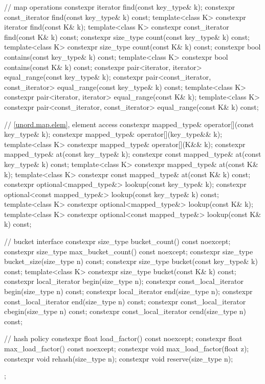 \begin{codeblock}
{{    // map operations
    constexpr iterator         find(const key_type& k);
    constexpr const_iterator   find(const key_type& k) const;
    template<class K>
      constexpr iterator       find(const K& k);
    template<class K>
      constexpr const_iterator find(const K& k) const;
    constexpr size_type        count(const key_type& k) const;
    template<class K>
      constexpr size_type      count(const K& k) const;
    constexpr bool             contains(const key_type& k) const;
    template<class K>
      constexpr bool           contains(const K& k) const;
    constexpr pair<iterator, iterator>               equal_range(const key_type& k);
    constexpr pair<const_iterator, const_iterator>   equal_range(const key_type& k) const;
    template<class K>
      constexpr pair<iterator, iterator>             equal_range(const K& k);
    template<class K>
      constexpr pair<const_iterator, const_iterator> equal_range(const K& k) const;

    // \ref{unord.map.elem}, element access
    constexpr mapped_type& operator[](const key_type& k);
    constexpr mapped_type& operator[](key_type&& k);
    template<class K> constexpr mapped_type& operator[](K&& k);
    constexpr mapped_type& at(const key_type& k);
    constexpr const mapped_type& at(const key_type& k) const;
    template<class K> constexpr mapped_type& at(const K& k);
    template<class K> constexpr const mapped_type& at(const K& k) const;
    constexpr optional<mapped_type&>       lookup(const key_type& k);
    constexpr optional<const mapped_type&> lookup(const key_type& k) const;
    template<class K> constexpr optional<mapped_type&>       lookup(const K& k);
    template<class K> constexpr optional<const mapped_type&> lookup(const K& k) const;

    // bucket interface
    constexpr size_type bucket_count() const noexcept;
    constexpr size_type max_bucket_count() const noexcept;
    constexpr size_type bucket_size(size_type n) const;
    constexpr size_type bucket(const key_type& k) const;
    template<class K> constexpr size_type bucket(const K& k) const;
    constexpr local_iterator begin(size_type n);
    constexpr const_local_iterator begin(size_type n) const;
    constexpr local_iterator end(size_type n);
    constexpr const_local_iterator end(size_type n) const;
    constexpr const_local_iterator cbegin(size_type n) const;
    constexpr const_local_iterator cend(size_type n) const;

    // hash policy
    constexpr float load_factor() const noexcept;
    constexpr float max_load_factor() const noexcept;
    constexpr void max_load_factor(float z);
    constexpr void rehash(size_type n);
    constexpr void reserve(size_type n);
  };

}
\end{codeblock}
